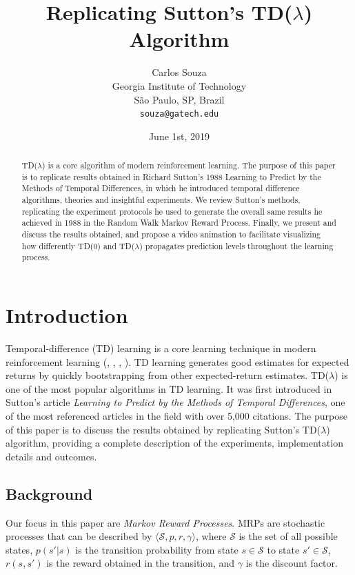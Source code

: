 \documentclass{article}
\title{Replicating Sutton's TD($\lambda$) Algorithm}
\date{June 1st, 2019}	%
\author{
  Carlos Souza\\
  Georgia Institute of Technology\\
  São Paulo, SP, Brazil \\
  \texttt{souza@gatech.edu} \\
}
\begin{document}
\maketitle

\begin{abstract}
    TD($\lambda$) is a core algorithm of modern reinforcement learning.
    The purpose of this paper is to replicate results obtained in Richard Sutton's 1988 Learning to Predict by the Methods of Temporal Differences, in which he introduced temporal difference algorithms, theories and insightful experiments.
    We review Sutton's methods, replicating the experiment protocols he used to generate the overall same results he achieved in 1988 in the Random Walk Markov Reward Process.
    Finally, we present and discuss the results obtained, and propose a video animation to facilitate visualizing how differently TD(0) and TD($\lambda$) propagates prediction levels throughout the learning process.
\end{abstract}




\section{Introduction}
\label{sec:introduction}
Temporal-difference (TD) learning is a core learning technique in modern reinforcement learning (\cite{Sutton1988}, \cite{Sutton:1998:IRL:551283}, \cite{KLMSurvey}, \cite{Szepesvari:2010:ARL:1855083}).
TD learning generates good estimates for expected returns by quickly bootstrapping from other expected-return estimates.
TD($\lambda$) is one of the most popular algorithms in TD learning.
It was first introduced in Sutton's article \emph{Learning to Predict by the Methods of Temporal Differences}, one of the most referenced articles in the field with over 5,000 citations.
The purpose of this paper is to discuss the results obtained by replicating Sutton's TD($\lambda$) algorithm, providing a complete description of the experiments, implementation details and outcomes.

\subsection{Background}
\label{subsec:background}
Our focus in this paper are \emph{Markov Reward Processes}.
MRPs are stochastic processes that can be described by \(\langle\mathcal{S}, p, r, \gamma\rangle\), where \(\mathcal{S}\) is the set of all possible states, \(p(s'|s)\) is the transition probability from state \(s \in \mathcal{S}\) to state \(s' \in \mathcal{S}\), \(r(s, s')\) is the reward obtained in the transition, and \(\gamma\) is the discount factor.
\end{document}
